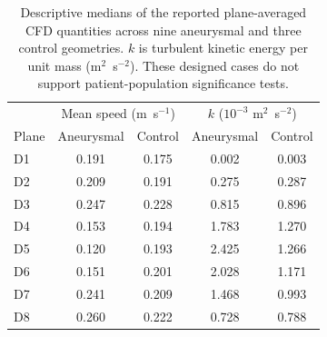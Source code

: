 \begin{table}[htbp]
\centering
\caption{Descriptive medians of the reported plane-averaged CFD quantities across nine aneurysmal and three control geometries. $k$ is turbulent kinetic energy per unit mass (m$^2$~s$^{-2}$). These designed cases do not support patient-population significance tests.}
\label{tab:plane_cfd}
\begin{tabular}{lcccc}
\toprule
& \multicolumn{2}{c}{Mean speed (m~s$^{-1}$)} & \multicolumn{2}{c}{$k$ ($10^{-3}$ m$^2$~s$^{-2}$)} \\
Plane & Aneurysmal & Control & Aneurysmal & Control \\
\midrule
D1 & 0.191 & 0.175 & 0.002 & 0.003 \\
D2 & 0.209 & 0.191 & 0.275 & 0.287 \\
D3 & 0.247 & 0.228 & 0.815 & 0.896 \\
D4 & 0.153 & 0.194 & 1.783 & 1.270 \\
D5 & 0.120 & 0.193 & 2.425 & 1.266 \\
D6 & 0.151 & 0.201 & 2.028 & 1.171 \\
D7 & 0.241 & 0.209 & 1.468 & 0.993 \\
D8 & 0.260 & 0.222 & 0.728 & 0.788 \\
\bottomrule
\end{tabular}
\end{table}
